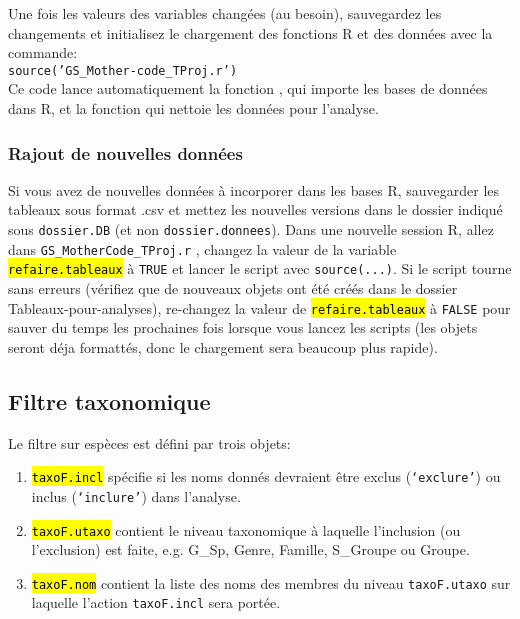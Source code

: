 \documentclass{article}
\newcommand{\mcode} {\texttt{GS\_MotherCode\_TProj.r}{ }}
\begin{document}
Une fois les valeurs des
variables changées (au besoin), sauvegardez les changements et
initialisez le chargement des fonctions R et des données avec la commande: \\
\texttt{source('GS\_Mother-code\_TProj.r')}\\

Ce code lance automatiquement la fonction ,
qui importe les bases de données dans R, et la fonction
 qui nettoie les données pour l'analyse.

\subsubsection{Rajout de nouvelles données}
Si vous avez de nouvelles données à incorporer dans les bases R, sauvegarder les tableaux sous format .csv et mettez les nouvelles versions dans le dossier indiqué sous \texttt{dossier.DB} (et non \texttt{dossier.donnees}). Dans une nouvelle session R, allez dans \mcode, changez la valeur de la variable \hl{\texttt{refaire.tableaux}} à \texttt{TRUE} et lancer le script avec \texttt{source(...)}. Si le script tourne sans erreurs (vérifiez que de nouveaux objets ont été créés dans le dossier Tableaux-pour-analyses), re-changez la valeur de \hl{\texttt{refaire.tableaux}} à \texttt{FALSE} pour sauver du temps les prochaines fois lorsque vous lancez les scripts (les objets seront déja formattés, donc le chargement sera beaucoup plus rapide).

\subsection{Filtre taxonomique} \label{ftaxo}

Le filtre sur espèces est défini par trois objets:

\begin{enumerate}
  \item \hl{\texttt{taxoF.incl}} spécifie si les noms donnés devraient être
    exclus (\texttt{`exclure'}) ou inclus (\texttt{`inclure'}) dans
    l'analyse.
  \item \hl{\texttt{taxoF.utaxo}} contient le niveau taxonomique à laquelle
    l'inclusion (ou l'exclusion) est faite, e.g. G\_Sp, Genre,
    Famille, S\_Groupe ou Groupe.
   \item \hl{\texttt{taxoF.nom}} contient la liste des noms des membres du
     niveau \texttt{taxoF.utaxo} sur laquelle l'action
     \texttt{taxoF.incl} sera portée.
\end{enumerate}
\end{document}
